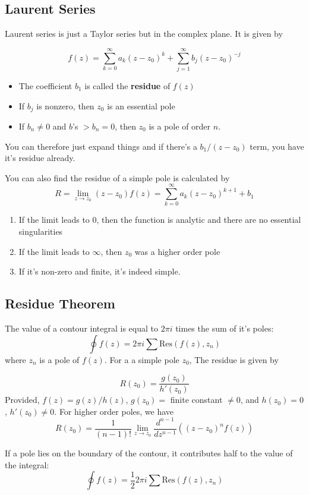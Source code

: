 \documentclass{article}
\begin{document}
\subsection{Laurent Series}
Laurent series is just a Taylor series but in the complex plane.  It is given by

$$
f(z) = \sum_{k=0}^\infty a_k(z-z_0)^k + \sum_{j=1}^\infty b_j(z-z_0)^{-j}
$$
\begin{itemize}
    \item The coefficient $b_1$ is called the \textbf{residue} of $f(z)$
    \item If $b_j$ is nonzero, then $z_0$ is an essential pole
    \item If $b_n \neq 0$ and $b$'s $>b_n = 0$, then $z_0$ is a pole of order $n$.
\end{itemize}
You can therefore just expand things and if there's a $b_1/(z-z_0)$ term, you have it's residue already.

You can also find the residue of a simple pole is calculated by 
$$
R = \lim_{z\to z_0} (z-z_0) f(z) = \sum_{k=0}^{\infty} a_k(z-z_0)^{k+1} + b_1
$$

\begin{enumerate}
    \item If the limit leads to 0, then the function is analytic and there are no essential singularities
    \item If the limit leads to $\infty$, then $z_0$ was a higher order pole
    \item If it's non-zero and finite, it's indeed simple. 
\end{enumerate}

\subsection{Residue Theorem}
The value of a contour integral is equal to $2\pi i$ times the sum of it's poles:
$$
\oint f(z) = 2\pi i\sum \text{Res}(f(z), z_n)
$$
where $z_n$ is a pole of $f(z)$. For a a simple pole $z_0$, The residue is given by 

$$
R(z_0) = \frac{g(z_0)}{h'(z_0)}
$$
Provided, $f(z) = g(z)/h(z)$, $g(z_0) = $ finite constant $\neq 0$, and $h(z_0) = 0$, $h'(z_0) \neq 0$.  For higher order poles, we have
$$
R(z_0) = \frac{1}{(n-1)!} \lim_{z \to z_0} \frac{d^{n-1}}{dz^{n-1}}\left( (z-z_0)^n f(z) \right)
$$

If a pole lies on the boundary of the contour, it contributes half to the value of the integral:
$$
\oint f(z) = \frac{1}{2} 2\pi i\sum \text{Res}(f(z), z_n)
$$
\end{document}
